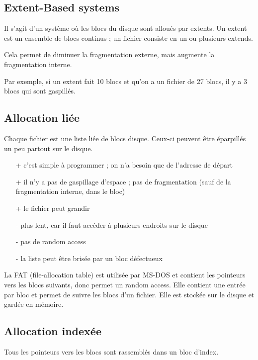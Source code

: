 	\subsection{Extent-Based systems}
	
	Il s'agit d'un système où les blocs du disque sont alloués par extents. Un extent est un ensemble de blocs continus ; un fichier consiste en un ou plusieurs extends.
	
	Cela permet de diminuer la fragmentation externe, mais augmente la fragmentation interne.
	
	Par exemple, si un extent fait 10 blocs et qu'on a un fichier de 27 blocs, il y a 3 blocs qui sont gaspillés.
	
	\subsection{Allocation liée}
	
	Chaque fichier est une liste liée de blocs disque. Ceux-ci peuvent être éparpillés un peu partout sur le disque.
	
	
	\begin{itemize}
		\item[+] c'est simple à programmer ; on n'a besoin que de l'adresse de départ
		\item[+] il n'y a pas de gaspillage d'espace ; pas de fragmentation (sauf de la fragmentation interne, dans le bloc)
		\item[+] le fichier peut grandir
		\item[-] plus lent, car il faut accéder à plusieurs endroits sur le disque
		\item[-] pas de random access
		\item[-] la liste peut être brisée par un bloc défectueux
	\end{itemize}
	
	La FAT (file-allocation table) est utilisée par MS-DOS et contient les pointeurs vers les blocs suivants, donc permet un random access. Elle contient une entrée par bloc et permet de suivre les blocs d'un fichier. Elle est stockée sur le disque et gardée en mémoire.
	
	
	\subsection{Allocation indexée}
	
	Tous les pointeurs vers les blocs sont rassemblés dans un bloc d'index.
	
